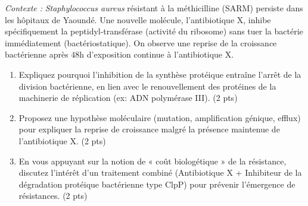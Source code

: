 \documentclass[11pt]{article}
\begin{document}
\begin{exercice}
\textit{Contexte :} \textit{Staphylococcus aureus} résistant à la méthicilline (SARM) persiste dans les hôpitaux de Yaoundé. Une nouvelle molécule, l'antibiotique X, inhibe spécifiquement la peptidyl-transférase (activité du ribosome) sans tuer la bactérie immédiatement (bactériostatique). On observe une reprise de la croissance bactérienne après 48h d'exposition continue à l'antibiotique X.

\begin{enumerate}
    \item Expliquez pourquoi l'inhibition de la synthèse protéique entraîne l'arrêt de la division bactérienne, en lien avec le renouvellement des protéines de la machinerie de réplication (ex: ADN polymérase III). (2 pts)
    \item Proposez une hypothèse moléculaire (mutation, amplification génique, efflux) pour expliquer la reprise de croissance malgré la présence maintenue de l'antibiotique X. (2 pts)
    \item En vous appuyant sur la notion de « coût biologétique » de la résistance, discutez l'intérêt d'un traitement combiné (Antibiotique X + Inhibiteur de la dégradation protéique bactérienne type ClpP) pour prévenir l'émergence de résistances. (2 pts)
\end{enumerate}
\end{exercice}
\end{document}

